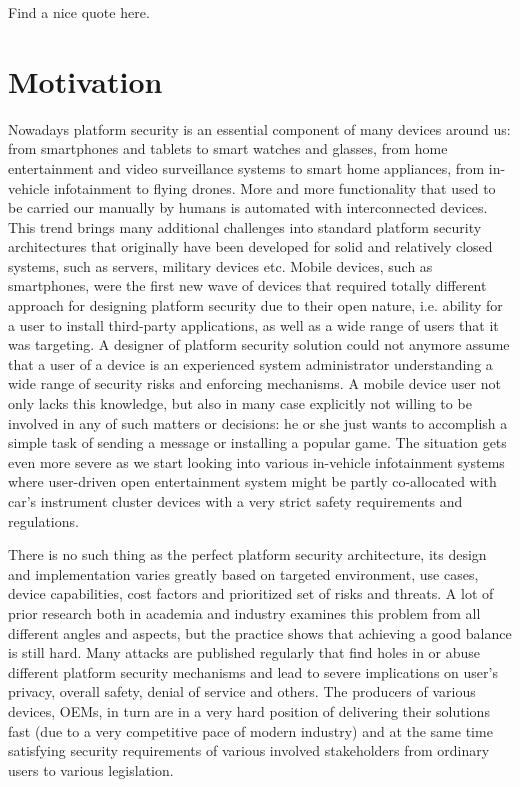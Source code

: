 \begin{quoting}
Find a nice quote here.
\end{quoting}

\section{Motivation}

Nowadays platform security is an essential component of many devices around us: from smartphones and tablets to smart watches and glasses, from home entertainment and video surveillance systems to smart home appliances, from in-vehicle infotainment to flying drones. More and more functionality that used to be carried our manually by humans is automated with interconnected devices. This trend brings many additional challenges into standard platform security architectures that originally have been developed for solid and relatively closed systems, such as servers, military devices etc. Mobile devices, such as smartphones, were the first new wave of devices that required totally different approach for designing platform security due to their open nature, i.e. ability for a user to install third-party applications, as well as a wide range of users that it was targeting. A designer of platform security solution could not anymore assume that a user of a device is an experienced system administrator understanding a wide range of security risks and enforcing mechanisms. A mobile device user not only lacks this knowledge, but also in many case explicitly not willing to be involved in any of such matters or decisions: he or she just wants to accomplish a simple task of sending a message or installing a popular game. The situation gets even more severe as we start looking into various in-vehicle infotainment systems where user-driven open entertainment system might be partly co-allocated with car's instrument cluster devices with a very strict safety requirements and regulations. 

There is no such thing as the perfect platform security architecture, its design and implementation varies greatly based on targeted environment, use cases, device capabilities, cost factors and prioritized set of risks and threats. A lot of prior research both in academia and industry examines this problem from all different angles and aspects, but the practice shows that achieving a good balance is still hard. Many attacks are published regularly that find holes in or abuse different platform security mechanisms and lead to severe implications on user's privacy, overall safety, denial of service and others. The producers of various devices, OEMs, in turn are in a very hard position of delivering their solutions fast (due to a very competitive pace of modern industry) and at the same time satisfying security requirements of various involved stakeholders from ordinary users to various legislation. 

